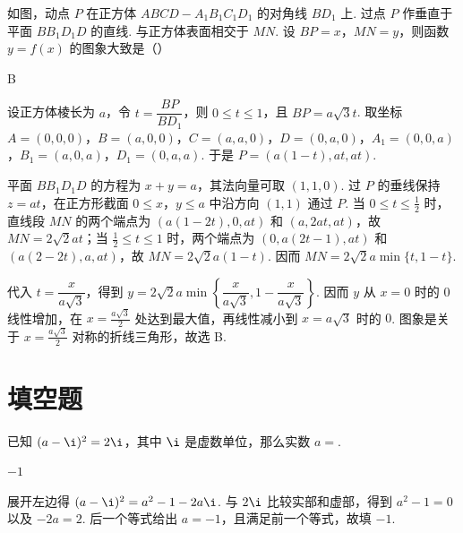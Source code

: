 \begin{problem}
如图，动点 \(P\) 在正方体 \(ABCD - A_{1}B_{1}C_{1}D_{1}\) 的对角线 \(BD_{1}\) 上. 过点 \(P\) 作垂直于平面 \(BB_{1}D_{1}D\) 的直线. 与正方体表面相交于 \(MN\). 设 \(BP = x\)，\(MN = y\)，则函数 \(y = f(x)\) 的图象大致是（\quad）


\choices
    {}
    {}
    {}
    {}

\begin{answer}
B
\end{answer}

\begin{solution}
设正方体棱长为 \(a\)，令 \(t=\dfrac{BP}{BD_1}\)，则 \(0\leqslant t\leqslant1\)，且 \(BP=a\sqrt3t\). 取坐标 \(A=(0,0,0)\)，\(B=(a,0,0)\)，\(C=(a,a,0)\)，\(D=(0,a,0)\)，\(A_1=(0,0,a)\)，\(B_1=(a,0,a)\)，\(D_1=(0,a,a)\). 于是 \(P=(a(1-t),at,at)\).

平面 \(BB_1D_1D\) 的方程为 \(x+y=a\)，其法向量可取 \((1,1,0)\). 过 \(P\) 的垂线保持 \(z=at\)，在正方形截面 \(0\leqslant x\)，\(y\leqslant a\) 中沿方向 \((1,1)\) 通过 \(P\). 当 \(0\leqslant t\leqslant\frac12\) 时，直线段 \(MN\) 的两个端点为 \((a(1-2t),0,at)\) 和 \((a,2at,at)\)，故 \(MN=2\sqrt2at\)；当 \(\frac12\leqslant t\leqslant1\) 时，两个端点为 \((0,a(2t-1),at)\) 和 \((a(2-2t),a,at)\)，故 \(MN=2\sqrt2a(1-t)\). 因而 \(MN=2\sqrt2a\min\{t,1-t\}\).

代入 \(t=\dfrac{x}{a\sqrt3}\)，得到 \(y=2\sqrt2a\min\left\{\dfrac{x}{a\sqrt3},1-\dfrac{x}{a\sqrt3}\right\}\). 因而 \(y\) 从 \(x=0\) 时的 \(0\) 线性增加，在 \(x=\frac{a\sqrt3}{2}\) 处达到最大值，再线性减小到 \(x=a\sqrt3\) 时的 \(0\). 图象是关于 \(x=\frac{a\sqrt3}{2}\) 对称的折线三角形，故选 B.
\end{solution}
\end{problem}

\section{填空题}

\begin{problem}
已知 \((a - \i)^2 = 2\i\)，其中 \(\i\) 是虚数单位，那么实数 \(a = \)\fillinblank{}.

\begin{answer}
\(-1\)
\end{answer}

\begin{solution}
展开左边得 \((a-\i)^2=a^2-1-2a\i\). 与 \(2\i\) 比较实部和虚部，得到 \(a^2-1=0\) 以及 \(-2a=2\). 后一个等式给出 \(a=-1\)，且满足前一个等式，故填 \(-1\).
\end{solution}
\end{problem}

